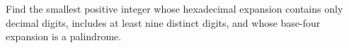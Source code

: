 Find the smallest positive integer whose hexadecimal expansion contains only decimal digits, includes at least nine distinct digits, and whose base-four expansion is a palindrome.
